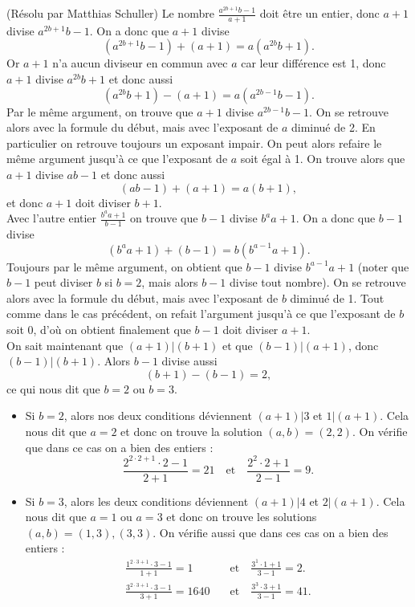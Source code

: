 \begin{sol}[22](R\'esolu par Matthias Schuller)
Le nombre $\frac{a^{2b+1}b-1}{a+1}$ doit \^etre un entier, donc $a+1$ divise $a^{2b+1}b-1$. On a donc que $a+1$ divise
\[(a^{2b+1}b-1)+(a+1)=a(a^{2b}b+1).\]
Or $a+1$ n'a aucun diviseur en commun avec $a$ car leur diff\'erence est 1, donc $a+1$ divise $a^{2b}b+1$ et donc aussi
\[(a^{2b}b+1)-(a+1)=a(a^{2b-1}b-1).\]
Par le m\^eme argument, on trouve que $a+1$ divise $a^{2b-1}b-1$. On se retrouve alors avec la formule du d\'ebut, mais avec l'exposant de $a$ diminu\'e de 2. En particulier on retrouve toujours un exposant impair. On peut alors refaire le m\^eme argument jusqu'\`a ce que l'exposant de $a$ soit \'egal \`a 1. On trouve alors que $a+1$ divise $ab-1$ et donc aussi
\[(ab-1)+(a+1)=a(b+1),\]
et donc $a+1$ doit diviser $b+1$.\\

Avec l'autre entier $\frac{b^aa+1}{b-1}$ on trouve que $b-1$ divise $b^aa+1$. On a donc que $b-1$ divise
\[(b^aa+1)+(b-1)=b(b^{a-1}a+1).\]
Toujours par le m\^eme argument, on obtient que $b-1$ divise $b^{a-1}a+1$ (noter que $b-1$ peut diviser $b$ si $b=2$, mais alors $b-1$ divise tout nombre). On se retrouve alors avec la formule du d\'ebut, mais avec l'exposant de $b$ diminu\'e de 1. Tout comme dans le cas pr\'ec\'edent, on refait l'argument jusqu'\`a ce que l'exposant de $b$ soit 0, d'o\`u on obtient finalement que $b-1$ doit diviser $a+1$.\\

On sait maintenant que $(a+1)|(b+1)$ et que $(b-1)|(a+1)$, donc $(b-1)|(b+1)$. Alors $b-1$ divise aussi
\[(b+1)-(b-1)=2,\]
ce qui nous dit que $b=2$ ou $b=3$.
\begin{itemize}
\item Si $b=2$, alors nos deux conditions d\'eviennent $(a+1)|3$ et $1|(a+1)$. Cela nous dit que $a=2$ et donc on trouve la solution $(a,b)=(2,2)$. On v\'erifie que dans ce cas on a bien des entiers :
\[\frac{2^{2\cdot 2+1}\cdot 2-1}{2+1}=21\quad\text{et}\quad\frac{2^2\cdot 2+1}{2-1}=9.\]
\item Si $b=3$, alors les deux conditions d\'eviennent $(a+1)|4$ et $2|(a+1)$. Cela nous dit que $a=1$ ou $a=3$ et donc on trouve les solutions $(a,b)=(1,3),(3,3)$. On v\'erifie aussi que dans ces cas on a bien des entiers :
\begin{align*}
\frac{1^{2\cdot 3+1}\cdot 3-1}{1+1}=1\quad&\text{et}\quad\frac{3^1\cdot 1+1}{3-1}=2.\\
\frac{3^{2\cdot 3+1}\cdot 3-1}{3+1}=1640\quad&\text{et}\quad\frac{3^3\cdot 3+1}{3-1}=41.
\end{align*}
\end{itemize}
\end{sol}

